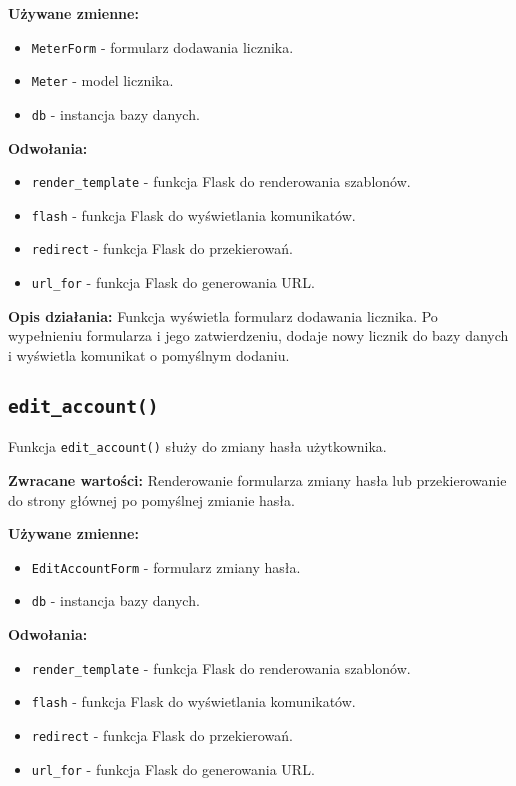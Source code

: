\documentclass[12pt,a4paper]{report}
\begin{document}
\textbf{Używane zmienne:}
\begin{itemize}
    \item \texttt{MeterForm} - formularz dodawania licznika.
    \item \texttt{Meter} - model licznika.
    \item \texttt{db} - instancja bazy danych.
\end{itemize}

\textbf{Odwołania:}
\begin{itemize}
    \item \texttt{render\_template} - funkcja Flask do renderowania szablonów.
    \item \texttt{flash} - funkcja Flask do wyświetlania komunikatów.
    \item \texttt{redirect} - funkcja Flask do przekierowań.
    \item \texttt{url\_for} - funkcja Flask do generowania URL.
\end{itemize}

\textbf{Opis działania:}
Funkcja wyświetla formularz dodawania licznika. Po wypełnieniu formularza i jego zatwierdzeniu, dodaje nowy licznik do bazy danych i wyświetla komunikat o pomyślnym dodaniu.

\subsection{\texttt{edit\_account()}}
\label{sec:edit_account}
Funkcja \texttt{edit\_account()} służy do zmiany hasła użytkownika.

\textbf{Zwracane wartości:} Renderowanie formularza zmiany hasła lub przekierowanie do strony głównej po pomyślnej zmianie hasła.

\textbf{Używane zmienne:}
\begin{itemize}
    \item \texttt{EditAccountForm} - formularz zmiany hasła.
    \item \texttt{db} - instancja bazy danych.
\end{itemize}

\textbf{Odwołania:}
\begin{itemize}
    \item \texttt{render\_template} - funkcja Flask do renderowania szablonów.
    \item \texttt{flash} - funkcja Flask do wyświetlania komunikatów.
    \item \texttt{redirect} - funkcja Flask do przekierowań.
    \item \texttt{url\_for} - funkcja Flask do generowania URL.
\end{itemize}
\end{document}
